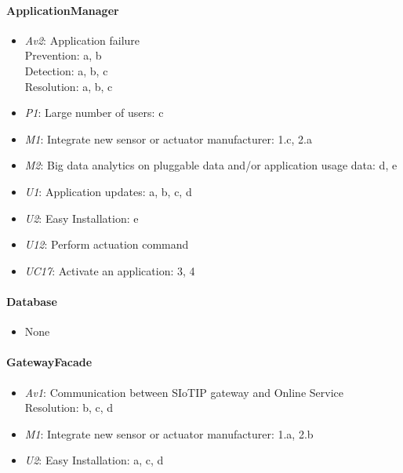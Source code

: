    \paragraph{ApplicationManager}
        \begin{itemize}
            \item  \emph{Av2}: Application failure \\
                   Prevention: a, b \\
                   Detection: a, b, c \\
                   Resolution: a, b, c
           \item \emph{P1}: Large number of users: c
           \item \emph{M1}: Integrate new sensor or actuator manufacturer: 1.c, 2.a
           \item \emph{M2}: Big data analytics on pluggable data and/or application usage data: d, e
           \item \emph{U1}: Application updates: a, b, c, d
           \item \emph{U2}: Easy Installation: e
           \item \emph{U12}: Perform actuation command
           \item \emph{UC17}: Activate an application: 3, 4
        \end{itemize}

    \paragraph{Database}
        \begin{itemize}
          	\item None
        \end{itemize}

    \paragraph{GatewayFacade}
        \begin{itemize}
            \item \emph{Av1}: Communication between SIoTIP gateway and Online Service \\
                               Resolution: b, c, d
            \item \emph{M1}: Integrate new sensor or actuator manufacturer: 1.a, 2.b
            \item \emph{U2}: Easy Installation: a, c, d
        \end{itemize}

